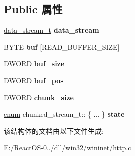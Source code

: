 \subsection*{Public 属性}
\begin{DoxyCompactItemize}
\item 
\mbox{\label{structchunked__stream__t_a12915113c37db5236679301d422a3a2a}} 
\hyperlink{structdata__stream__t}{data\+\_\+stream\+\_\+t} {\bfseries data\+\_\+stream}
\item 
\mbox{\label{structchunked__stream__t_a2f192929f703024d7441f4eb3a3ded6e}} 
B\+Y\+TE {\bfseries buf} \mbox{[}R\+E\+A\+D\+\_\+\+B\+U\+F\+F\+E\+R\+\_\+\+S\+I\+ZE\mbox{]}
\item 
\mbox{\label{structchunked__stream__t_a05e31ac8c506489867cc9bfac7fe92cb}} 
D\+W\+O\+RD {\bfseries buf\+\_\+size}
\item 
\mbox{\label{structchunked__stream__t_a0170f8e253c178a008e42fe0082ff248}} 
D\+W\+O\+RD {\bfseries buf\+\_\+pos}
\item 
\mbox{\label{structchunked__stream__t_ae6e369b82ed3e20e2ac8ac40c4b2dda1}} 
D\+W\+O\+RD {\bfseries chunk\+\_\+size}
\item 
\mbox{\label{structchunked__stream__t_a271f2a8ae47f5515f87d70897d363741}} 
\hyperlink{interfaceenum}{enum} chunked\+\_\+stream\+\_\+t\+:: \{ ... \}  {\bfseries state}
\end{DoxyCompactItemize}


该结构体的文档由以下文件生成\+:\begin{DoxyCompactItemize}
\item 
E\+:/\+React\+O\+S-\/0../dll/win32/wininet/http.\+c\end{DoxyCompactItemize}
